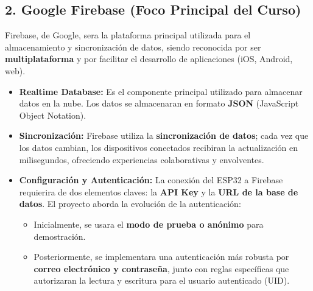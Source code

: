 \documentclass{article}
\begin{document}
\subsection*{2. Google Firebase (Foco Principal del Curso)}
Firebase, de Google, sera la plataforma principal utilizada para el 
almacenamiento y sincronización de datos, siendo reconocida por ser 
\textbf{multiplataforma} y por facilitar el desarrollo de aplicaciones 
(iOS, Android, web).
\begin{itemize}
    \item \textbf{Realtime Database:} Es el componente principal 
    utilizado para almacenar datos en la nube. Los datos se almacenaran 
    en formato \textbf{JSON} (JavaScript Object Notation).
    \item \textbf{Sincronización:} Firebase utiliza la 
    \textbf{sincronización de datos}; cada vez que los datos cambian, 
    los dispositivos conectados recibiran la actualización en 
    milisegundos, ofreciendo experiencias colaborativas y envolventes.
    \item \textbf{Configuración y Autenticación:} La conexión del ESP32 
    a Firebase requierira de dos elementos claves: la \textbf{API Key} y 
    la \textbf{URL de la base de datos}. El proyecto aborda la evolución 
    de la autenticación:
        \begin{itemize}
            \item Inicialmente, se usara el 
            \textbf{modo de prueba o anónimo} para demostración.
            \item Posteriormente, se implementara una autenticación más 
            robusta por \textbf{correo electrónico y contraseña}, junto 
            con reglas específicas que autorizaran la lectura y 
            escritura para el usuario autenticado (UID).
        \end{itemize}
\end{itemize}
\end{document}
